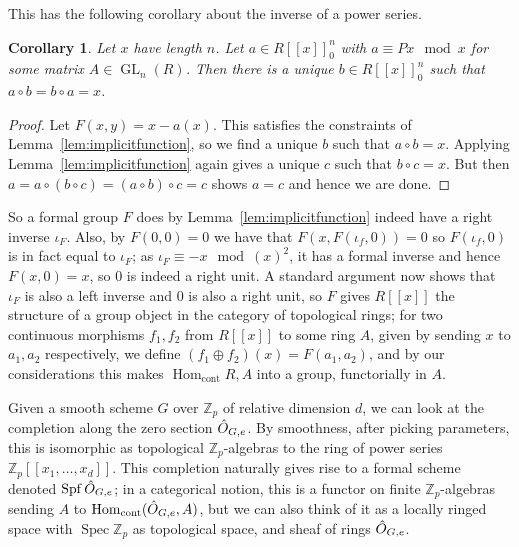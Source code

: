 \documentclass{article}
\newcommand{\Z}{\mathbb{Z}}
\DeclareMathOperator{\Hom}{Hom}
\DeclareMathOperator{\Spec}{Spec}
\DeclareMathOperator{\Spf}{Spf}
\DeclareMathOperator{\GL}{GL}
\theoremstyle{plain}
\newtheorem{cor}[thm]{Corollary} %
\theoremstyle{definition}
\theoremstyle{remark}
\begin{document}
This has the following corollary about the inverse of a power series.
\begin{cor}
\label{lem:formalinverse}
Let $x$ have length $n$. Let $a \in R[[x]]_0^n$ with $a \equiv Px \mod x$ for some matrix $A\in \GL_n(R)$. Then there is a unique $b \in R[[x]]_0^n$ such that $a \circ b = b \circ a = x$.
\end{cor}
\begin{proof}
Let $F(x,y) = x - a(x)$. This satisfies the constraints of Lemma~\ref{lem:implicitfunction}, so we find a unique $b$ such that $a \circ b = x$. Applying Lemma~\ref{lem:implicitfunction} again gives a unique $c$ such that $b \circ c = x$. But then $a = a \circ (b \circ c) = (a \circ b) \circ c = c$ shows $a = c$ and hence we are done.
\end{proof}
So a formal group $F$ does by Lemma~\ref{lem:implicitfunction} indeed have a right inverse $\iota_F$. Also, by $F(0,0) = 0$ we have that $F(x,F(\iota_f,0)) = 0$ so $F(\iota_f,0)$ is in fact equal to $\iota_F$; as $\iota_F \equiv -x \mod (x)^2$, it has a formal inverse and hence $F(x,0) = x$, so $0$ is indeed a right unit. A standard argument now shows that $\iota_F$ is also a left inverse and $0$ is also a right unit, so $F$ gives $R[[x]]$ the structure of a group object in the category of topological rings; for two continuous morphisms $f_1,f_2$ from $R[[x]]$ to some ring $A$, given by sending $x$ to $a_1,a_2$ respectively, we define $(f_1 \oplus f_2)(x) = F(a_1,a_2)$, and by our considerations this makes $\Hom_{\text{cont}}{R,A}$ into a group, functorially in $A$.

Given a smooth scheme $G$ over $\Z_p$ of relative dimension $d$, we can look at the completion along the zero section $\Hat{O}_{G,e}$. By smoothness, after picking parameters, this is isomorphic as topological $\Z_p$-algebras to the ring of power series $\Z_p[[x_1,\dots,x_d]]$. This completion naturally gives rise to a formal scheme denoted $\Spf \Hat{O}_{G,e}$; in a categorical notion, this is a functor on finite $\Z_p$-algebras sending $A$ to $\Hom_{\text{cont}}(\Hat{O}_{G,e},A)$, but we can also think of it as a locally ringed space with $\Spec \Z_p$ as topological space, and sheaf of rings $\Hat{O}_{G,e}$. 
\end{document}
